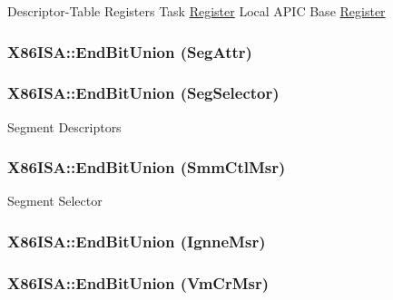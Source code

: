 \label{namespaceX86ISA_aab653d3e00074b5297080e982bfbdbde}
Descriptor-\/Table Registers Task \hyperlink{classRegister}{Register} Local APIC Base \hyperlink{classRegister}{Register} \hypertarget{namespaceX86ISA_a0c774257513afdcf9b7a3da6b27b4dfd}{
\subsubsection[{EndBitUnion}]{\setlength{\rightskip}{0pt plus 5cm}X86ISA::EndBitUnion (SegAttr)}}
\label{namespaceX86ISA_a0c774257513afdcf9b7a3da6b27b4dfd}
\hypertarget{namespaceX86ISA_a557b027e8beb1e3ff0df9a1e6d7bdbc3}{
\subsubsection[{EndBitUnion}]{\setlength{\rightskip}{0pt plus 5cm}X86ISA::EndBitUnion (SegSelector)}}
\label{namespaceX86ISA_a557b027e8beb1e3ff0df9a1e6d7bdbc3}
Segment Descriptors \hypertarget{namespaceX86ISA_a0e146559f65e9c20474dc622495ce138}{
\subsubsection[{EndBitUnion}]{\setlength{\rightskip}{0pt plus 5cm}X86ISA::EndBitUnion (SmmCtlMsr)}}
\label{namespaceX86ISA_a0e146559f65e9c20474dc622495ce138}
Segment Selector \hypertarget{namespaceX86ISA_a05c2d5933fc3e914d510e22f350a1299}{
\subsubsection[{EndBitUnion}]{\setlength{\rightskip}{0pt plus 5cm}X86ISA::EndBitUnion (IgnneMsr)}}
\label{namespaceX86ISA_a05c2d5933fc3e914d510e22f350a1299}
\hypertarget{namespaceX86ISA_a945ea244714dcda0e95132651a6b6a2b}{
\subsubsection[{EndBitUnion}]{\setlength{\rightskip}{0pt plus 5cm}X86ISA::EndBitUnion (VmCrMsr)}}
\label{namespaceX86ISA_a945ea244714dcda0e95132651a6b6a2b}
